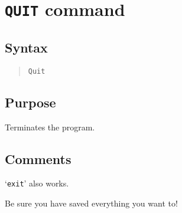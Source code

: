 \section{{\tt QUIT} command}
\subsection{Syntax}
\begin{verse}
{\tt Quit}
\end{verse}
\subsection{Purpose}

Terminates the program.
\subsection{Comments}

`{\tt exit}' also works.

Be sure you have saved everything you want to!
